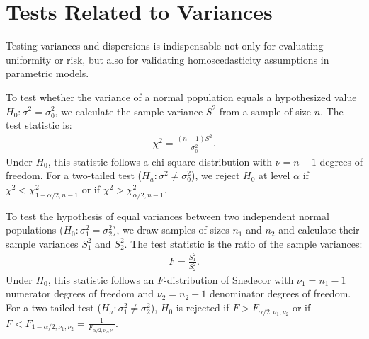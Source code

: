 \section{Tests Related to Variances}

Testing variances and dispersions is indispensable not only for evaluating uniformity or risk, but also for validating homoscedasticity assumptions in parametric models.

\begin{teorema}
	To test whether the variance of a normal population equals a hypothesized value $H_0: \sigma^2 = \sigma_0^2$, we calculate the sample variance $S^2$ from a sample of size $n$. The test statistic is:
	\begin{align}
		\chi^2 = \frac{(n-1)S^2}{\sigma_0^2}.
	\end{align}
	Under $H_0$, this statistic follows a chi-square distribution with $\nu = n - 1$ degrees of freedom.
	For a two-tailed test ($H_a: \sigma^2 \neq \sigma_0^2$), we reject $H_0$ at level $\alpha$ if $\chi^2 < \chi^2_{1-\alpha/2, n-1}$ or if $\chi^2 > \chi^2_{\alpha/2, n-1}$.
\end{teorema}

\begin{teorema}
	To test the hypothesis of equal variances between two independent normal populations ($H_0: \sigma_1^2 = \sigma_2^2$), we draw samples of sizes $n_1$ and $n_2$ and calculate their sample variances $S_1^2$ and $S_2^2$. The test statistic is the ratio of the sample variances:
	\begin{align}
		F = \frac{S_1^2}{S_2^2}.
	\end{align}
	Under $H_0$, this statistic follows an $F$-distribution of Snedecor with $\nu_1 = n_1 - 1$ numerator degrees of freedom and $\nu_2 = n_2 - 1$ denominator degrees of freedom.
	For a two-tailed test ($H_a: \sigma_1^2 \neq \sigma_2^2$), $H_0$ is rejected if $F > F_{\alpha/2, \nu_1, \nu_2}$ or if $F < F_{1-\alpha/2, \nu_1, \nu_2} = \frac{1}{F_{\alpha/2, \nu_2, \nu_1}}$.
\end{teorema}

